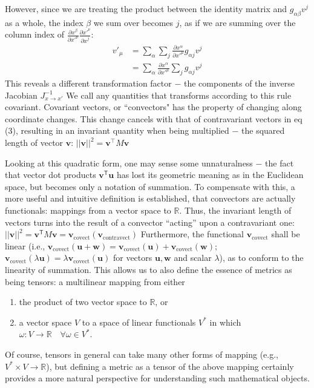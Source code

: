 \documentclass[conference]{IEEEtran}
\begin{document}
However, since we are treating the product between the identity matrix and 
$g_{\alpha\beta} v^j$ as a whole, the index $\beta$ we sum over becomes $j$, as if 
we are summing over the column index of 
$\frac{\partial x^\beta}{{\partial x'}^\nu}\frac{\partial{x'}^\nu}{{\partial x}^j}$:
\begin{align*}
v'_\mu &= 
\sum_{\alpha} \sum_{j} \frac{\partial x^\alpha}{\partial x'^\mu} 
g_{\alpha j} v^j \\
&=
\sum_{\alpha} \frac{\partial x^\alpha}{\partial x'^\mu} 
\sum_{j} g_{\alpha j} v^j
\end{align*}
This reveals a different transformation factor $-$ the components of the inverse Jacobian 
$J_{x \rightarrow x'}^{-1}$ 
We call any quantities that transforms according to this rule covariant. 
Covariant vectors, or ``convectors" has the property of changing along coordinate changes. 
This change cancels with that of contravariant vectors in eq (3), resulting in an 
invariant quantity when being multiplied $-$ the squared length of vector $\mathbf{v}$: 
$||\mathbf{v}||^2 = \mathbf{v}^\top M \mathbf{v}$

Looking at this quadratic form, one may sense some unnaturalness $-$ the fact 
that vector dot products $\mathbf{v}^{\mathsf{T}} \mathbf{u}$ has lost its 
geometric meaning as in the Euclidean space, but becomes only a notation of 
summation. To compensate with this, a more useful and intuitive 
definition is established, that convectors are actually functionals: mappings 
from a vector space to $\mathbb{R}$. Thus, the invariant length of vectors 
turns into the result of a convector “acting” upon a contravariant one: 
$||\mathbf{v}||^2 = \mathbf{v}^{\mathsf{T}} M \mathbf{v} = 
\mathbf{v}_{\text{covect}}(\mathbf{v}_{\text{contravect}})$ Furthermore, the 
functional $\mathbf{v}_{\text{covect}}$ shall be linear (i.e., 
$\mathbf{v}_{\text{covect}}(\mathbf{u}+\mathbf{w})=\mathbf{v}_{\text{covect}}(\mathbf{u})+
\mathbf{v}_{\text{covect}}(\mathbf{w})$; $\mathbf{v}_{\text{covect}}(\lambda \mathbf{u})=\lambda 
\mathbf{v}_{\text{covect}}(\mathbf{u})$ for vectors $\mathbf{u}, \mathbf{w}$ and scalar $\lambda$), 
as to conform to the linearity of summation. This allows us to also 
define the essence of metrics as being tensors: a multilinear mapping from either
\begin{enumerate}
    \item the product of two vector space to $\mathbb{R}$, or
    \item a vector space $V$ to a space of linear functionals $V^*$ 
    in which $\omega: V \rightarrow \mathbb{R} \quad \forall \omega \in V^*$.
\end{enumerate}
Of course, tensors in general can take many other forms of mapping 
(e.g., $V^* \times V \rightarrow \mathbb{R}$), but defining a metric as a tensor of the above 
mapping certainly provides a more natural perspective for understanding 
such mathematical objects.
\end{document}
